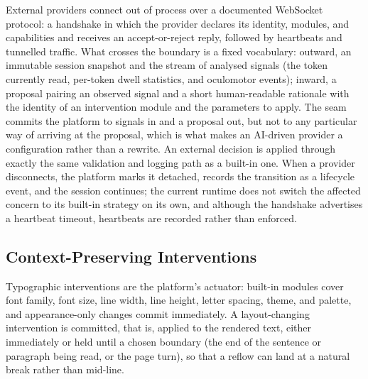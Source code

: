 External providers connect out of process over a documented WebSocket protocol: a handshake in which the provider declares its identity, modules, and capabilities and receives an accept-or-reject reply, followed by heartbeats and tunnelled traffic.
What crosses the boundary is a fixed vocabulary: outward, an immutable session snapshot and the stream of analysed signals (the token currently read, per-token dwell statistics, and oculomotor events); inward, a proposal pairing an observed signal and a short human-readable rationale with the identity of an intervention module and the parameters to apply.
The seam commits the platform to signals in and a proposal out, but not to any particular way of arriving at the proposal, which is what makes an AI-driven provider a configuration rather than a rewrite.
An external decision is applied through exactly the same validation and logging path as a built-in one.
When a provider disconnects, the platform marks it detached, records the transition as a lifecycle event, and the session continues; the current runtime does not switch the affected concern to its built-in strategy on its own, and although the handshake advertises a heartbeat timeout, heartbeats are recorded rather than enforced.

\subsection{Context-Preserving Interventions}
\label{sec:platform-context}

Typographic interventions are the platform's actuator: built-in modules cover font family, font size, line width, line height, letter spacing, theme, and palette, and appearance-only changes commit immediately.
A layout-changing intervention is committed, that is, applied to the rendered text, either immediately or held until a chosen boundary (the end of the sentence or paragraph being read, or the page turn), so that a reflow can land at a natural break rather than mid-line.

